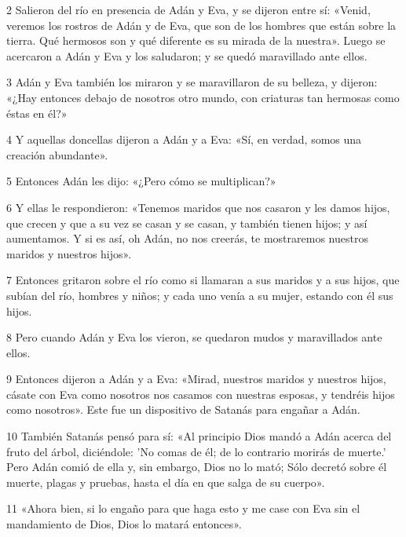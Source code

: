 \par 2 Salieron del río en presencia de Adán y Eva, y se dijeron entre sí: «Venid, veremos los rostros de Adán y de Eva, que son de los hombres que están sobre la tierra. Qué hermosos son y qué diferente es su mirada de la nuestra». Luego se acercaron a Adán y Eva y los saludaron; y se quedó maravillado ante ellos.

\par 3 Adán y Eva también los miraron y se maravillaron de su belleza, y dijeron: «¿Hay entonces debajo de nosotros otro mundo, con criaturas tan hermosas como éstas en él?»

\par 4 Y aquellas doncellas dijeron a Adán y a Eva: «Sí, en verdad, somos una creación abundante».

\par 5 Entonces Adán les dijo: «¿Pero cómo se multiplican?»

\par 6 Y ellas le respondieron: «Tenemos maridos que nos casaron y les damos hijos, que crecen y que a su vez se casan y se casan, y también tienen hijos; y así aumentamos. Y si es así, oh Adán, no nos creerás, te mostraremos nuestros maridos y nuestros hijos».

\par 7 Entonces gritaron sobre el río como si llamaran a sus maridos y a sus hijos, que subían del río, hombres y niños; y cada uno venía a su mujer, estando con él sus hijos.

\par 8 Pero cuando Adán y Eva los vieron, se quedaron mudos y maravillados ante ellos.

\par 9 Entonces dijeron a Adán y a Eva: «Mirad, nuestros maridos y nuestros hijos, cásate con Eva como nosotros nos casamos con nuestras esposas, y tendréis hijos como nosotros». Este fue un dispositivo de Satanás para engañar a Adán.

\par 10 También Satanás pensó para sí: «Al principio Dios mandó a Adán acerca del fruto del árbol, diciéndole: 'No comas de él; de lo contrario morirás de muerte.' Pero Adán comió de ella y, sin embargo, Dios no lo mató; Sólo decretó sobre él muerte, plagas y pruebas, hasta el día en que salga de su cuerpo».

\par 11 «Ahora bien, si lo engaño para que haga esto y me case con Eva sin el mandamiento de Dios, Dios lo matará entonces».

